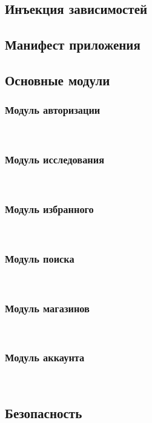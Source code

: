 \subsection{Инъекция зависимостей}

\subsection{Манифест приложения}

\subsection{Основные модули}

\subsubsection{Модуль авторизации}~\par

\subsubsection{Модуль исследования}~\par

\subsubsection{Модуль избранного}~\par

\subsubsection{Модуль поиска}~\par

\subsubsection{Модуль магазинов}~\par

\subsubsection{Модуль аккаунта}~\par

\subsection{Безопасность}

